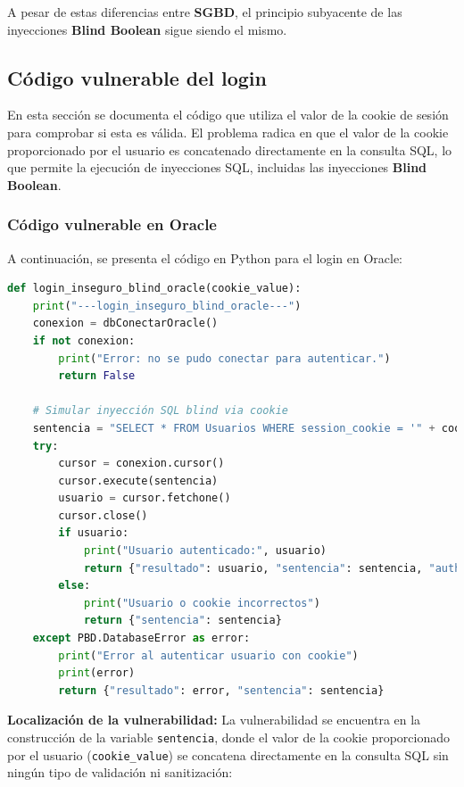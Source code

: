 \documentclass[a4paper,12pt]{article}
\begin{document}
A pesar de estas diferencias entre \textbf{SGBD}, el principio subyacente de las inyecciones \textbf{Blind Boolean} sigue siendo el mismo.

\subsection{Código vulnerable del login}

En esta sección se documenta el código que utiliza el valor de la cookie de sesión para comprobar si esta es válida. El problema radica en que el valor de la cookie proporcionado por el usuario es concatenado directamente en la consulta SQL, lo que permite la ejecución de inyecciones SQL, incluidas las inyecciones \textbf{Blind Boolean}.

\subsubsection{Código vulnerable en Oracle}

A continuación, se presenta el código en Python para el login en Oracle:

\begin{lstlisting}[language=Python]
def login_inseguro_blind_oracle(cookie_value):
    print("---login_inseguro_blind_oracle---")
    conexion = dbConectarOracle()
    if not conexion:
        print("Error: no se pudo conectar para autenticar.")
        return False

    # Simular inyección SQL blind via cookie
    sentencia = "SELECT * FROM Usuarios WHERE session_cookie = '" + cookie_value + "'"
    try:
        cursor = conexion.cursor()
        cursor.execute(sentencia)
        usuario = cursor.fetchone()
        cursor.close()
        if usuario:
            print("Usuario autenticado:", usuario)
            return {"resultado": usuario, "sentencia": sentencia, "auth": "true"}
        else:
            print("Usuario o cookie incorrectos")
            return {"sentencia": sentencia}
    except PBD.DatabaseError as error:
        print("Error al autenticar usuario con cookie")
        print(error)
        return {"resultado": error, "sentencia": sentencia}
\end{lstlisting}

\textbf{Localización de la vulnerabilidad:} La vulnerabilidad se encuentra en la construcción de la variable \texttt{sentencia}, donde el valor de la cookie proporcionado por el usuario (\texttt{cookie\_value}) se concatena directamente en la consulta SQL sin ningún tipo de validación ni sanitización:
\end{document}
